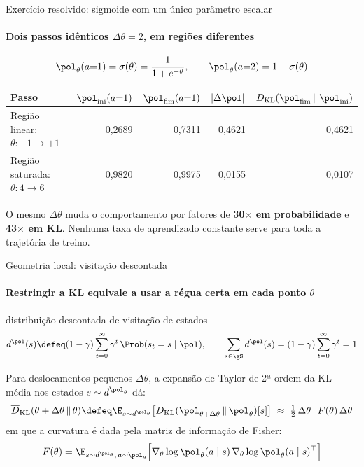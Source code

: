 \documentclass[aspectratio=169, 11pt]{beamer}
\newcommand{\KL}{D_{\mathrm{KL}}}
\newcommand{\KLbar}{\overline{D}_{\mathrm{KL}}}
\newcommand{\azul}[1]{{\color{rlAzulClaro}#1}}
\begin{document}
\begin{frame}{Exercício resolvido: sigmoide com um único parâmetro escalar}
  \framesubtitle{Dois passos idênticos $\Delta\theta = 2$, em regiões diferentes}

  \[
    \pol_\theta(a{=}1) = \sigma(\theta) = \frac{1}{1+e^{-\theta}},\qquad \pol_\theta(a{=}2) = 1-\sigma(\theta)
  \]
  \begin{center}\small
    \begin{tabular}{@{}lrrrr@{}}
      \toprule
      \textbf{Passo} & $\pol_{\text{ini}}(a{=}1)$ & $\pol_{\text{fim}}(a{=}1)$ & $|\Delta\pol|$ & $\KL(\pol_{\text{fim}}\,\|\,\pol_{\text{ini}})$ \\
      \midrule
      Região linear: $\theta: -1\to+1$ & 0,2689 & 0,7311 & \azul{0,4621} & \azul{0,4621} \\
      Região saturada: $\theta: 4\to6$ & 0,9820 & 0,9975 & {\color{rlLaranja}0,0155} & {\color{rlLaranja}0,0107} \\
      \bottomrule
    \end{tabular}
  \end{center}

  O mesmo $\Delta\theta$ muda o comportamento por fatores de \textbf{30$\times$ em probabilidade}
  e \textbf{43$\times$ em KL}. Nenhuma taxa de aprendizado constante serve para toda a trajetória de treino.
\end{frame}

\begin{frame}{Geometria local: visitação descontada}
  \framesubtitle{Restringir a KL equivale a usar a régua certa em cada ponto $\theta$}

  \begin{defbox}{distribuição descontada de visitação de estados}
    \[
      d^{\pol}(s) \defeq (1-\gamma)\sum_{t=0}^{\infty}\gamma^t\,\Prob(s_t = s\mid\pol),\qquad
      \sum_{s\in\gS} d^{\pol}(s) = (1-\gamma)\sum_{t=0}^{\infty}\gamma^t = 1
    \]
  \end{defbox}

  Para deslocamentos pequenos $\Delta\theta$, a expansão de Taylor de 2ª ordem da KL média nos
  estados $s\sim d^{\pol_\theta}$ dá:
  \[
    \KLbar(\theta+\Delta\theta\,\|\,\theta) \defeq \E_{s\sim d^{\pol_\theta}}\big[\KL(\pol_{\theta+\Delta\theta}\,\|\,\pol_\theta)[s]\big]
      \;\approx\;\tfrac12\,\Delta\theta^\top F(\theta)\,\Delta\theta
  \]
  em que a curvatura é dada pela matriz de informação de Fisher:
  \[
    F(\theta) = \E_{s\sim d^{\pol_\theta},\,a\sim\pol_\theta}\Big[\nabla_\theta\log\pol_\theta(a\mid s)\,
      \nabla_\theta\log\pol_\theta(a\mid s)^\top\Big]
  \]
\end{frame}
\end{document}
